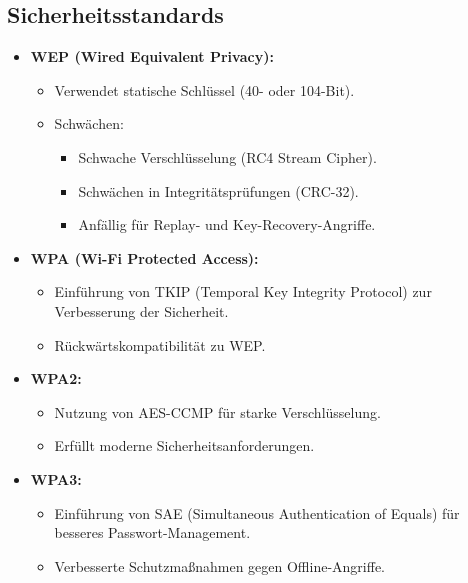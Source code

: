 \documentclass{article}
\begin{document}
\subsection{Sicherheitsstandards}
\begin{itemize}
    \item \textbf{WEP (Wired Equivalent Privacy):}
    \begin{itemize}
        \item Verwendet statische Schlüssel (40- oder 104-Bit).
        \item Schwächen:
        \begin{itemize}
            \item Schwache Verschlüsselung (RC4 Stream Cipher).
            \item Schwächen in Integritätsprüfungen (CRC-32).
            \item Anfällig für Replay- und Key-Recovery-Angriffe.
        \end{itemize}
    \end{itemize}
    \item \textbf{WPA (Wi-Fi Protected Access):}
    \begin{itemize}
        \item Einführung von TKIP (Temporal Key Integrity Protocol) zur Verbesserung der Sicherheit.
        \item Rückwärtskompatibilität zu WEP.
    \end{itemize}
    \item \textbf{WPA2:}
    \begin{itemize}
        \item Nutzung von AES-CCMP für starke Verschlüsselung.
        \item Erfüllt moderne Sicherheitsanforderungen.
    \end{itemize}
    \item \textbf{WPA3:}
    \begin{itemize}
        \item Einführung von SAE (Simultaneous Authentication of Equals) für besseres Passwort-Management.
        \item Verbesserte Schutzmaßnahmen gegen Offline-Angriffe.
    \end{itemize}
\end{itemize}
\end{document}
